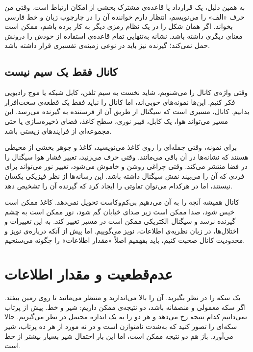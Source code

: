 به همین دلیل، یک قرارداد یا قاعده‌ی مشترک بخشی از امکان ارتباط است. وقتی من حرف «الف» را می‌نویسم، انتظار دارم خواننده آن را در چارچوب زبان و خط فارسی بخواند. اگر همان شکل را در یک نظام رمزی دیگر به کار برده باشم، ممکن است معنای دیگری داشته باشد. نشانه به‌تنهایی تمام قاعده‌ی استفاده از خودش را درونش حمل نمی‌کند؛ گیرنده نیز باید در نوعی زمینه‌ی تفسیری قرار داشته باشد.

\subsection{کانال فقط یک سیم نیست}
\label{sub:channel-not-only-wire}

وقتی واژه‌ی کانال را می‌شنویم، شاید نخست به سیم تلفن، کابل شبکه یا موج رادیویی فکر کنیم. این‌ها نمونه‌های خوبی‌اند، اما کانال را نباید فقط یک قطعه‌ی سخت‌افزار بدانیم. کانال، مسیری است که سیگنال از طریق آن از فرستنده به گیرنده می‌رسد. این مسیر می‌تواند هوا، یک کابل، فیبر نوری، سطح کاغذ، فضای ذخیره‌سازی یا حتی مجموعه‌ای از فرایندهای زیستی باشد.

برای نمونه، وقتی جمله‌ای را روی کاغذ می‌نویسید، کاغذ و جوهر بخشی از محیطی هستند که نشانه‌ها در آن باقی می‌مانند. وقتی حرف می‌زنید، تغییر فشار هوا سیگنال را در فضا منتشر می‌کند. وقتی چراغی روشن و خاموش می‌شود، تغییر نور می‌تواند برای فردی که آن را می‌بیند نقش سیگنال داشته باشد. این رسانه‌ها از نظر فیزیکی یکسان نیستند، اما در هرکدام می‌توان تفاوتی را ایجاد کرد که گیرنده آن را تشخیص دهد.

کانال همیشه آنچه را به آن می‌دهیم بی‌کم‌وکاست تحویل نمی‌دهد. کاغذ ممکن است خیس شود، صدا ممکن است زیر صدای خیابان گم شود، نور ممکن است به چشم گیرنده نرسد و سیگنال الکتریکی ممکن است در مسیر تغییر کند. به این تغییرات و اختلال‌ها، در زبان نظریه‌ی اطلاعات، نویز می‌گوییم. اما پیش از آنکه درباره‌ی نویز و محدودیت کانال صحبت کنیم، باید بفهمیم اصلاً «مقدار اطلاعات» را چگونه می‌سنجیم.

\section{عدم‌قطعیت و مقدار اطلاعات}
\label{sec:uncertainty-and-information}

یک سکه را در نظر بگیرید. آن را بالا می‌اندازید و منتظر می‌مانید تا روی زمین بیفتد. اگر سکه معمولی و منصفانه باشد، دو نتیجه‌ی ممکن داریم: شیر و خط. پیش از پرتاب نمی‌دانیم کدام نتیجه رخ می‌دهد و هر دو را به یک اندازه محتمل در نظر می‌گیریم. حالا سکه‌ای را تصور کنید که به‌شدت نامتوازن است و در نه مورد از هر ده پرتاب، شیر می‌آورد. باز هم دو نتیجه ممکن است، اما این بار احتمال شیر بسیار بیشتر از خط است.

